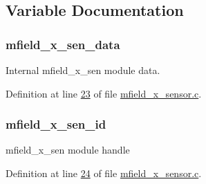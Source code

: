 \subsection{Variable Documentation}
\hypertarget{a00050_af8c531b1ba5fea148fb9111e06058f92}{
\subsubsection[{mfield\+\_\+x\+\_\+sen\+\_\+data}]{ mfield\+\_\+x\+\_\+sen\+\_\+data}}\label{a00050_af8c531b1ba5fea148fb9111e06058f92}


Internal mfield\+\_\+x\+\_\+sen module data. 



Definition at line \hyperlink{a00050_source_l00023}{23} of file \hyperlink{a00050_source}{mfield\+\_\+x\+\_\+sensor.\+c}.

\hypertarget{a00050_a19a33e680bf19d1aed76750132ed8b64}{
\subsubsection[{mfield\+\_\+x\+\_\+sen\+\_\+id}]{ mfield\+\_\+x\+\_\+sen\+\_\+id}}\label{a00050_a19a33e680bf19d1aed76750132ed8b64}


mfield\+\_\+x\+\_\+sen module handle 



Definition at line \hyperlink{a00050_source_l00024}{24} of file \hyperlink{a00050_source}{mfield\+\_\+x\+\_\+sensor.\+c}.

